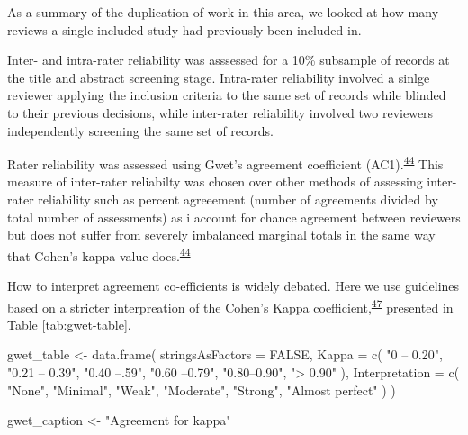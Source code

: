 \documentclass[a4paper, twoside]{templates/ociamthesis}
\newenvironment{Shaded}{\begin{snugshade}}{\end{snugshade}}
\newcommand{\AttributeTok}[1]{\textcolor[rgb]{0.77,0.63,0.00}{#1}}
\newcommand{\ConstantTok}[1]{\textcolor[rgb]{0.00,0.00,0.00}{#1}}
\newcommand{\FunctionTok}[1]{\textcolor[rgb]{0.00,0.00,0.00}{#1}}
\newcommand{\NormalTok}[1]{#1}
\newcommand{\OtherTok}[1]{\textcolor[rgb]{0.56,0.35,0.01}{#1}}
\newcommand{\StringTok}[1]{\textcolor[rgb]{0.31,0.60,0.02}{#1}}
\renewenvironment{Shaded}
{
  \vspace{4pt}%
  \begin{snugshade}%
}{%
  \end{snugshade}%
  \vspace{4pt}%
}
\begin{document}
As a summary of the duplication of work in this area, we looked at how many reviews a single included study had previously been included in.

Inter- and intra-rater reliability was asssessed for a 10\% subsample of records at the title and abstract screening stage. Intra-rater reliability involved a sinlge reviewer applying the inclusion criteria to the same set of records while blinded to their previous decisions, while inter-rater reliability involved two reviewers independently screening the same set of records.

Rater reliability was assessed using Gwet's agreement coefficient (AC1).\textsuperscript{\protect\hyperlink{ref-gwet2008}{44}} This measure of inter-rater reliabilty was chosen over other methods of assessing inter-rater reliability such as percent agreeement (number of agreements divided by total number of assessments) as i account for chance agreement between reviewers but does not suffer from severely imbalanced marginal totals in the same way that Cohen's kappa value does.\textsuperscript{\protect\hyperlink{ref-gwet2008}{44}}

How to interpret agreement co-efficients is widely debated. Here we use guidelines based on a stricter interpreation of the Cohen's Kappa coefficient,\textsuperscript{\protect\hyperlink{ref-mchugh2012}{47}} presented in Table \ref{tab:gwet-table}.

\begin{Shaded}
\begin{Highlighting}[]
\NormalTok{gwet\_table }\OtherTok{\textless{}{-}} \FunctionTok{data.frame}\NormalTok{(}
  \AttributeTok{stringsAsFactors =} \ConstantTok{FALSE}\NormalTok{,}
  \AttributeTok{Kappa =} \FunctionTok{c}\NormalTok{(}
    \StringTok{"0 – 0.20"}\NormalTok{,}
    \StringTok{"0.21 – 0.39"}\NormalTok{,}
    \StringTok{"0.40 –.59"}\NormalTok{,}
    \StringTok{"0.60 –0.79"}\NormalTok{,}
    \StringTok{"0.80–0.90"}\NormalTok{,}
    \StringTok{"\textgreater{} 0.90"}
\NormalTok{  ),}
  \AttributeTok{Interpretation =} \FunctionTok{c}\NormalTok{(}
    \StringTok{"None"}\NormalTok{,}
    \StringTok{"Minimal"}\NormalTok{,}
    \StringTok{"Weak"}\NormalTok{,}
    \StringTok{"Moderate"}\NormalTok{,}
    \StringTok{"Strong"}\NormalTok{,}
    \StringTok{"Almost perfect"}
\NormalTok{  )}
\NormalTok{)}

\NormalTok{gwet\_caption }\OtherTok{\textless{}{-}} \StringTok{"Agreement for kappa"}
\end{Highlighting}
\end{Shaded}
\end{document}
